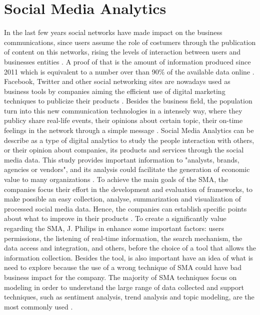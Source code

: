 \section{Social Media Analytics}\label{sec:socialmedia}
In the last few years social networks have made impact on the business communications, since users assume the role of costumers through the publication of content on this networks, rising the levels of interaction between users and businesses entities \cite{kn:Cecilia2016}. A proof of that is the amount of information produced since 2011 which is equivalent to a number over than 90\% of the available data online \cite{kn:SINTEF}. Facebook, Twitter and other social networking sites are nowadays used as business tools by companies aiming the efficient use of digital marketing techniques to publicize their products \cite{kn:Royle2014}. Besides the business field, the population turn into this new communication technologies in a intensely way, where they publicy share real-life events, their opinions about certain topic, their on-time feelings in the network through a simple message \cite{kn:DAndrea2015}.
Social Media Analytics can be describe as a type of digital analytics to study the people interaction with others, or their opinion about companies, its products and  services through the social media data. This study provides important information to "analysts, brands, agencies or vendors", and its analysis could facilitate the generation of economic value to many organizations \cite{kn:Judah2012}.
To achieve the main goals of the SMA, the companies focus their effort in the development and evaluation of frameworks, to make possible an easy collection, analyse, summarization and visualization of processed social media data. Hence, the companies can establish specific points about what to improve in their products \cite{kn:Zeng2010}.
To create a significantly value regarding the SMA, J. Philips in \cite{kn:Judah2012} enhance some important factors: users permissions, the listening of real-time information, the search mechanism, the data access and integration, and others, before the choice of a tool that allows the information collection. Besides the tool, is also important have an idea of what is need to explore because the use of a wrong technique of SMA could have bad business impact for the company. The majority of SMA techniques focus on modeling in order to understand the large range of data collected and support techniques, such as sentiment analysis, trend analysis and topic modeling, are the most commonly used \cite{kn:Fan2013}.

